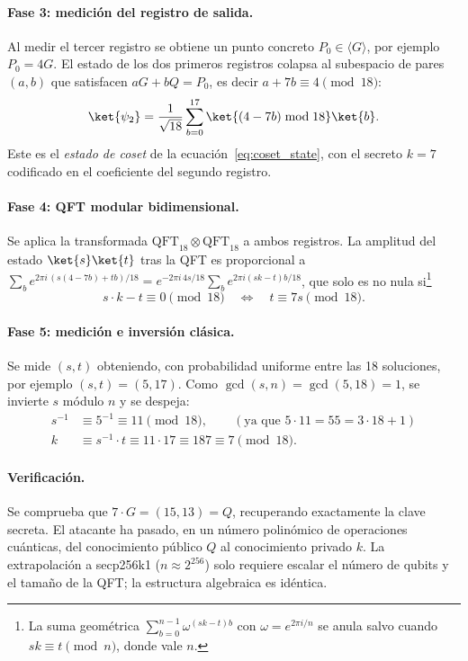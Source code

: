 \paragraph{Fase 3: medición del registro de salida.} Al medir el tercer registro se obtiene un punto concreto $P_0 \in \langle G \rangle$, por ejemplo $P_0 = 4G$. El estado de los dos primeros registros colapsa al subespacio de pares $(a,b)$ que satisfacen $aG + bQ = P_0$, es decir $a + 7b \equiv 4 \pmod{18}$:
\begin{equation}
  \ket{\psi_2} = \frac{1}{\sqrt{18}} \sum_{b=0}^{17} \ket{(4 - 7b) \bmod 18} \ket{b}.
\end{equation}
Este es el \emph{estado de coset} de la ecuación~\eqref{eq:coset_state}, con el secreto $k=7$ codificado en el coeficiente del segundo registro.

\paragraph{Fase 4: QFT modular bidimensional.} Se aplica la transformada $\text{QFT}_{18} \otimes \text{QFT}_{18}$ a ambos registros. La amplitud del estado $\ket{s}\ket{t}$ tras la QFT es proporcional a $\sum_b e^{2\pi i \, (s(4-7b) + tb)/18} = e^{-2\pi i\, 4s/18} \sum_b e^{2\pi i (sk - t)b/18}$, que solo es no nula si\footnote{La suma geométrica $\sum_{b=0}^{n-1} \omega^{(sk-t)b}$ con $\omega = e^{2\pi i/n}$ se anula salvo cuando $sk \equiv t \pmod n$, donde vale $n$.}
\begin{equation}
  s \cdot k - t \equiv 0 \pmod{18} \quad\Longleftrightarrow\quad t \equiv 7s \pmod{18}.
\end{equation}

\paragraph{Fase 5: medición e inversión clásica.} Se mide $(s, t)$ obteniendo, con probabilidad uniforme entre las 18 soluciones, por ejemplo $(s, t) = (5, 17)$. Como $\gcd(s, n) = \gcd(5, 18) = 1$, se invierte $s$ módulo $n$ y se despeja:
\begin{align}
  s^{-1} &\equiv 5^{-1} \equiv 11 \pmod{18}, \qquad (\text{ya que } 5 \cdot 11 = 55 = 3 \cdot 18 + 1)\\
  k &\equiv s^{-1} \cdot t \equiv 11 \cdot 17 \equiv 187 \equiv \boxed{7} \pmod{18}.
\end{align}

\paragraph{Verificación.} Se comprueba que $7 \cdot G = (15, 13) = Q$, recuperando exactamente la clave secreta. El atacante ha pasado, en un número polinómico de operaciones cuánticas, del conocimiento público $Q$ al conocimiento privado $k$. La extrapolación a secp256k1 ($n \approx 2^{256}$) solo requiere escalar el número de qubits y el tamaño de la QFT; la estructura algebraica es idéntica.

